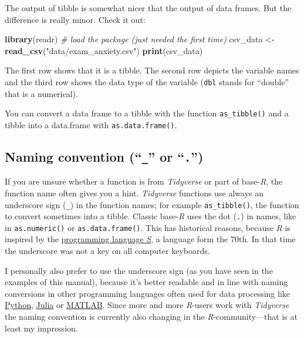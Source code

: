 \documentclass[
]{scrartcl}
\makeatletter
\newenvironment{Shaded}{\begin{snugshade}}{\end{snugshade}}
\newcommand{\CommentTok}[1]{\textcolor[rgb]{0.56,0.35,0.01}{\textit{#1}}}
\newcommand{\FunctionTok}[1]{\textcolor[rgb]{0.13,0.29,0.53}{\textbf{#1}}}
\newcommand{\NormalTok}[1]{#1}
\newcommand{\OtherTok}[1]{\textcolor[rgb]{0.56,0.35,0.01}{#1}}
\newcommand{\StringTok}[1]{\textcolor[rgb]{0.31,0.60,0.02}{#1}}
\newenvironment{kframe}{%
\medskip{}
\setlength{\fboxsep}{.8em}
 \def\at@end@of@kframe{}%
 \ifinner\ifhmode%
  \def\at@end@of@kframe{\end{minipage}}%
  \begin{minipage}{\columnwidth}%
 \fi\fi%
 \def\FrameCommand##1{\hskip\@totalleftmargin \hskip-\fboxsep
 \colorbox{shadecolor}{##1}\hskip-\fboxsep
     \hskip-\linewidth \hskip-\@totalleftmargin \hskip\columnwidth}%
 \MakeFramed {\advance\hsize-\width
   \@totalleftmargin\z@ \linewidth\hsize
   \@setminipage}}%
 {\par\unskip\endMakeFramed%
 \at@end@of@kframe}
\newenvironment{rmdblock}[1]
  {
  \begin{itemize}
  \renewcommand{\labelitemi}{
    \raisebox{-.7\height}[0pt][0pt]{
      {\setkeys{Gin}{width=3em,keepaspectratio}\texttt{[image: images/\#1]}}
    }
  }
  \setlength{\fboxsep}{1em}
  \begin{kframe}
  \item
  }
  {
  \end{kframe}
  \end{itemize}
  }
\newenvironment{geek}
    {\begin{rmdblock}{geek}}
    {\end{rmdblock}}
\makeatother
\begin{document}
The output of tibble is somewhat nicer that the output of data frames. But the difference is really minor. Check it out:

\begin{Shaded}
\begin{Highlighting}[]
\FunctionTok{library}\NormalTok{(readr) }\CommentTok{\# load the package (just needed the first time)}
\NormalTok{csv\_data }\OtherTok{\textless{}{-}} \FunctionTok{read\_csv}\NormalTok{(}\StringTok{"data/exam\_anxiety.csv"}\NormalTok{)}
\FunctionTok{print}\NormalTok{(csv\_data)}
\end{Highlighting}
\end{Shaded}

The first row shows that it is a tibble. The second row depicts the variable names and the third row shows the data type of the variable (\texttt{dbl} stands for ``double'' that is a numerical).

\begin{geek}
You can convert a data frame to a tibble with the function
\texttt{as\_tibble()} and a tibble into a data.frame with
\texttt{as.data.frame()}.
\end{geek}

\hypertarget{naming-convention-_-or-.}{%
\subsection{\texorpdfstring{Naming convention (``\texttt{\_}'' or ``\texttt{.}'')}{Naming convention (``\_'' or ``.'')}}\label{naming-convention-_-or-.}}

If you are unsure whether a function is from \emph{Tidyverse} or part of base-\emph{R}, the function name often gives you a hint. \emph{Tidyverse} functions use always an underscore sign (\texttt{\_}) in the function names; for example \texttt{as\_tibble()}, the function to convert sometimes into a tibble. Classic base-\emph{R} uses the dot (\texttt{.}) in names, like in \texttt{as.numeric()} or \texttt{as.data.frame()}. This has historical reasons, because \emph{R} is inspired by the \href{https://en.wikipedia.org/wiki/S_(programming_language)}{programming language \emph{S}}, a language form the 70th. In that time the underscore was not a key on all computer keyboards.

I personally also prefer to use the underscore sign (as you have seen in the examples of this manual), because it's better readable and in line with naming conversions in other programming languages often used for data processing like \href{https://www.python.org/}{Python}, \href{https://julialang.org/}{Julia} or \href{https://en.wikipedia.org/wiki/MATLAB}{MATLAB}. Since more and more \emph{R}-users work with \emph{Tidyverse} the naming convention is currently also changing in the \emph{R}-community---that is at least my impression.
\end{document}
